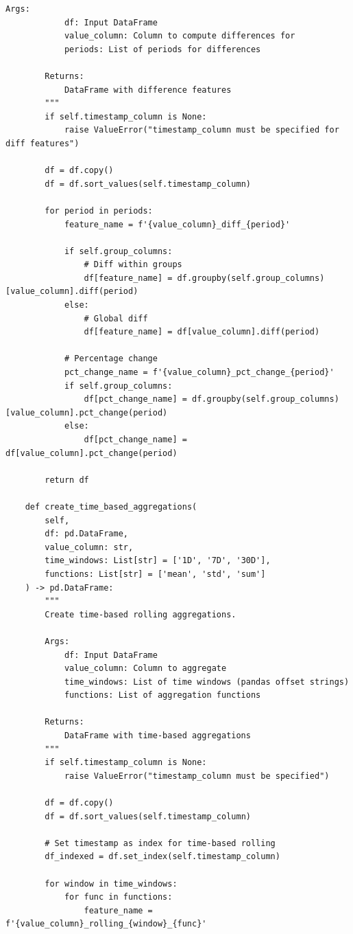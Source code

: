 \begin{lstlisting}[style=python, caption={Scalable Aggregation and Rolling Window Features}]
        Args:
            df: Input DataFrame
            value_column: Column to compute differences for
            periods: List of periods for differences

        Returns:
            DataFrame with difference features
        """
        if self.timestamp_column is None:
            raise ValueError("timestamp_column must be specified for diff features")

        df = df.copy()
        df = df.sort_values(self.timestamp_column)

        for period in periods:
            feature_name = f'{value_column}_diff_{period}'

            if self.group_columns:
                # Diff within groups
                df[feature_name] = df.groupby(self.group_columns)[value_column].diff(period)
            else:
                # Global diff
                df[feature_name] = df[value_column].diff(period)

            # Percentage change
            pct_change_name = f'{value_column}_pct_change_{period}'
            if self.group_columns:
                df[pct_change_name] = df.groupby(self.group_columns)[value_column].pct_change(period)
            else:
                df[pct_change_name] = df[value_column].pct_change(period)

        return df

    def create_time_based_aggregations(
        self,
        df: pd.DataFrame,
        value_column: str,
        time_windows: List[str] = ['1D', '7D', '30D'],
        functions: List[str] = ['mean', 'std', 'sum']
    ) -> pd.DataFrame:
        """
        Create time-based rolling aggregations.

        Args:
            df: Input DataFrame
            value_column: Column to aggregate
            time_windows: List of time windows (pandas offset strings)
            functions: List of aggregation functions

        Returns:
            DataFrame with time-based aggregations
        """
        if self.timestamp_column is None:
            raise ValueError("timestamp_column must be specified")

        df = df.copy()
        df = df.sort_values(self.timestamp_column)

        # Set timestamp as index for time-based rolling
        df_indexed = df.set_index(self.timestamp_column)

        for window in time_windows:
            for func in functions:
                feature_name = f'{value_column}_rolling_{window}_{func}'


\end{lstlisting}
